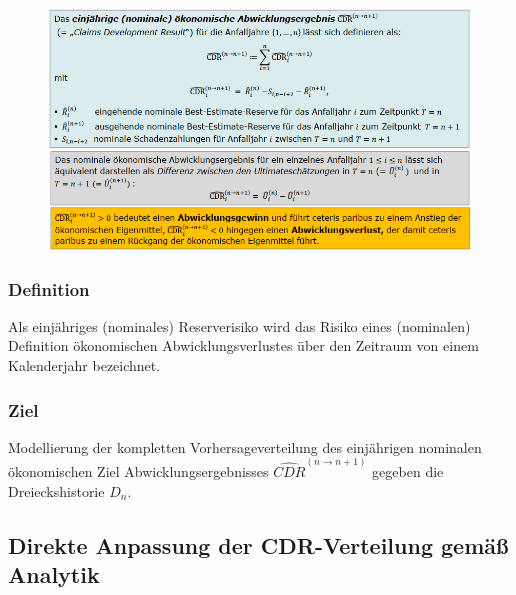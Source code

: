 \documentclass[12pt]{report}
\theoremstyle{dotless}
\theoremstyle{definition}
\begin{document}
\begin{figure}[ht]
	\centering
	\includegraphics[width= \textwidth]{Bilder/AbwErg.png}
\end{figure}

\subsubsection{Definition}
Als einjähriges (nominales) Reserverisiko wird das Risiko eines (nominalen)
Definition ökonomischen Abwicklungsverlustes über den Zeitraum von einem Kalenderjahr bezeichnet.

\subsubsection{Ziel}
Modellierung der kompletten Vorhersageverteilung des einjährigen nominalen ökonomischen Ziel Abwicklungsergebnisses $\hat{CDR}^{(n\rightarrow n+1)}$ gegeben die Dreieckshistorie $D_n$.

\subsection{Direkte Anpassung der CDR-Verteilung gemäß Analytik}
\end{document}

